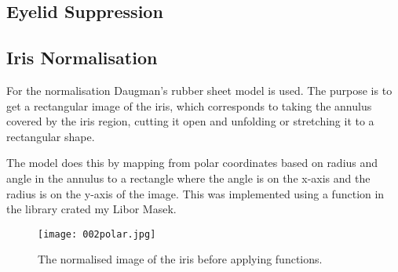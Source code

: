 \subsection{Eyelid Suppression}

\subsection{Iris Normalisation}
For the normalisation Daugman's rubber sheet model is used. The purpose is to get a rectangular image of the iris, which corresponds to taking the annulus covered by the iris region, cutting it open and unfolding or stretching it to a rectangular shape. 

The model does this by mapping from polar coordinates based on radius and angle in the annulus to a rectangle where the angle is on the x-axis and the radius is on the y-axis of the image. 
This was implemented using a function in the library crated my Libor Masek.




\begin{figure}[h]
\centering
\texttt{[image: 002polar.jpg]}
\caption{The normalised image of the iris before applying functions.}
\label{fig:SimPolar}
\end{figure}

